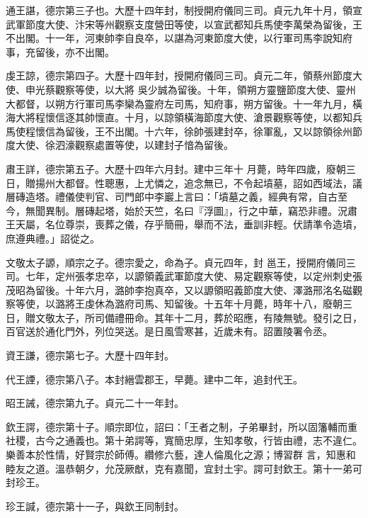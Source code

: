 \begin{pinyinscope}
 通王諶，德宗第三子也。大歷十四年封，制授開府儀同三司。貞元九年十月，領宣武軍節度大使、汴宋等州觀察支度營田等使，以宣武都知兵馬使李萬榮為留後，王不出閣。十一年，河東帥李自良卒，以諶為河東節度大使，以行軍司馬李說知府事，充留後，亦不出閣。



 虔王諒，德宗第四子。大歷十四年封，授開府儀同三司。貞元二年，領蔡州節度大使、申光蔡觀察等使，以大將
 吳少誠為留後。十年，領朔方靈鹽節度大使、靈州大都督，以朔方行軍司馬李欒為靈府左司馬，知府事，朔方留後。十一年九月，橫海大將程懷信逐其帥懷直。十月，以諒領橫海節度大使、滄景觀察等使，以都知兵馬使程懷信為留後，王不出閣。十六年，徐帥張建封卒，徐軍亂，又以諒領徐州節度大使、徐泗濠觀察處置等使，以建封子愔為留後。



 肅王詳，德宗第五子。大歷十四年六月封。建中三年十
 月薨，時年四歲，廢朝三日，贈揚州大都督。性聰惠，上尤憐之，追念無已，不令起墳墓，詔如西域法，議層磚造塔。禮儀使判官、司門郎中李巖上言曰：「墳墓之義，經典有常，自古至今，無聞異制。層磚起塔，始於天竺，名曰『浮圖』，行之中華，竊恐非禮。況肅王天屬，名位尊崇，喪葬之儀，存乎簡冊，舉而不法，垂訓非輕。伏請準令造墳，庶遵典禮。」詔從之。



 文敬太子謜，順宗之子。德宗愛之，命為子。貞元四年，封
 邕王，授開府儀同三司。七年，定州張孝忠卒，以謜領義武軍節度大使、易定觀察等使，以定州刺史張茂昭為留後。十年六月，潞帥李抱真卒，又以謜領昭義節度大使、澤潞邢洺名磁觀察等使，以潞將王虔休為潞府司馬、知留後。十五年十月薨，時年十八，廢朝三日，贈文敬太子，所司備禮冊命。其年十二月，葬於昭應，有陵無號。發引之日，百官送於通化門外，列位哭送。是日風雪寒甚，近歲未有。詔置陵署令丞。



 資王謙，德宗第七子。大歷十四年封。



 代王諲，德宗第八子。本封縉雲郡王，早薨。建中二年，追封代王。



 昭王誡，德宗第九子。貞元二十一年封。



 欽王諤，德宗第十子。順宗即位，詔曰：「王者之制，子弟畢封，所以固籓輔而重社稷，古今之通義也。第十弟諤等，寬簡忠厚，生知孝敬，行皆由禮，志不違仁。樂善本於性情，好賢宗於師傅。纘修六藝，達人倫風化之源；博習群
 言，知惠和睦友之道。溫恭朝夕，允茂厥猷，克有嘉聞，宜封土宇。諤可封欽王。第十一弟可封珍王。



 珍王諴，德宗第十一子，與欽王同制封。




\end{pinyinscope}
